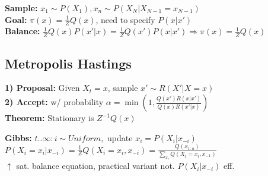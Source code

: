 \textbf{Sample:} $x_1 \sim P(X_1), x_n \sim P(X_N | X_{N-1} = x_{N-1})$\\

\textbf{Goal:} $\pi(x) = \frac{1}{Z} Q(x)$, need to specify $P(x|x')$\\

\textbf{Balance:} $\frac{1}{Z}Q(x)P(x'|x) = \frac{1}{Z}Q(x')P(x|x') \Rightarrow \pi(x) = \frac{1}{Z}Q(x)$\\
\begin{comment}
Given unnormalized distribution Q(x), we want to design a Markov chain with stationary distribution $\pi$. We can ensure that the stationary distribution is correct if it satisfies the detailed balance equation.\\
	It suffices to show that $P(X_t = x) = \frac{1}{Z}Q(x) \Rightarrow P(X_{t+1} = x) = \frac{1}{Z}Q(x)$.\\ 
	Proof: $P(X_{t+1} = x) = \sum_{x'} P(X_{t+1} = x, X_t = x') \\
	= \sum_{x'} P(X_{t+1} = x| X_t = x') P(X_t = x') \\
	= \sum_{x'} P(X_{t+1} = x| X_t = x') \frac{1}{Z}Q(x')\\
	= \sum_{x'} P(X_{t+1} = x'| X_t = x) \frac{1}{Z}Q(x)\\
	= \frac{1}{Z}Q(x)$\\
\end{comment}

\subsection{Metropolis Hastings}
\textbf{1) Proposal:} Given $X_t=x$, sample $x' \sim R(X' | X=x)$\\
\textbf{2) Accept:} w/ probability $\alpha = \min (1, \frac{Q(x')R(x|x')}{Q(x)R(x'|x)})$\\
\textbf{Theorem:} Stationary is $Z^{-1}Q(x)$\\
\begin{comment}
	The performance depends heavily on what we choose as proposal distribution R.\\
\end{comment}

\textbf{Gibbs:} $t..\infty: i\sim Uniform,$ update $x_i = P(X_i| x_{-i})$\\
$P(X_i = x_i| x_{-i}) = \frac{1}{Z} Q(X_i = x_i, x_{-i}) = \frac{Q(x_{1:n})}{\sum_{x_i} Q(X_i=x_i, x_{-1})}$\\
$\uparrow$ sat. balance equation, practical variant not. $P(X_i| x_{-i})$ eff.\\
\begin{comment}
	We are only updating one of the variables by conditioning on all the other variables.\\
	This can be done efficiently, as the normalizer has to be computed over all $x_i$, which are limited in f.e. a categorical distribution.\\
\end{comment}

